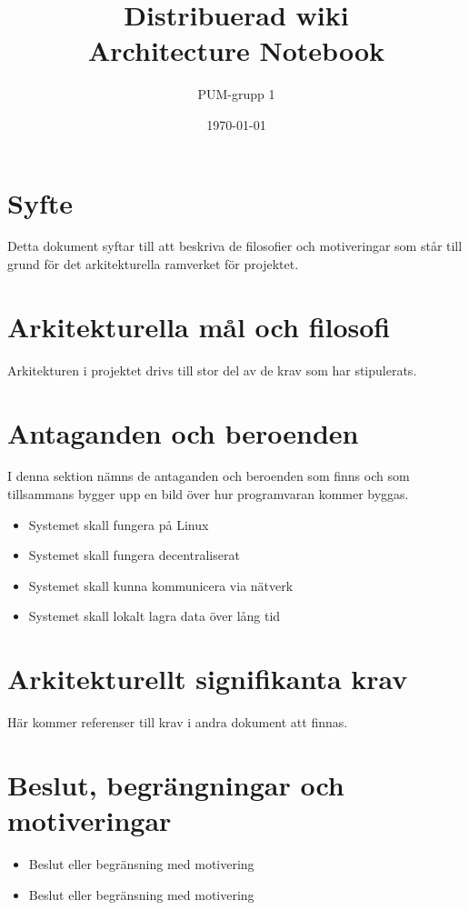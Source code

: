 

\ifpdf
\else
\fi

\title{Distribuerad wiki \\ Architecture Notebook}
\author{PUM-grupp 1}
\date{\today}



\maketitle

\thispagestyle{empty}
\newpage
\section{Syfte}
Detta dokument syftar till att beskriva de filosofier och motiveringar som står till grund för det arkitekturella ramverket för projektet.
\section{Arkitekturella mål och filosofi}
Arkitekturen i projektet drivs till stor del av de krav som har stipulerats.
\section{Antaganden och beroenden}
I denna sektion nämns de antaganden och beroenden som finns och som tillsammans bygger upp en bild över hur programvaran kommer byggas.
\begin{itemize}
\item Systemet skall fungera på Linux
\item Systemet skall fungera decentraliserat
\item Systemet skall kunna kommunicera via nätverk
\item Systemet skall lokalt lagra data över lång tid
\end{itemize}
\section{Arkitekturellt signifikanta krav}
Här kommer referenser till krav i andra dokument att finnas.
\section{Beslut, begrängningar och motiveringar}
\begin{itemize}
\item Beslut eller begränsning med motivering
\item Beslut eller begränsning med motivering
\end{itemize}
